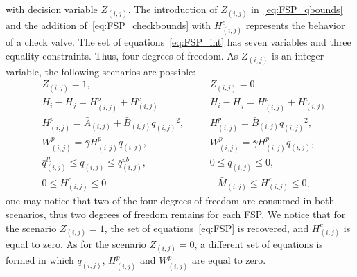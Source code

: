 with decision variable $Z_{(i,j)}$. The introduction of $Z_{(i,j)}$ in~\eqref{eq:FSP_qbounds} and the addition of~\eqref{eq:FSP_checkbounds} with $H^c_{(i,j)}$ represents the behavior of a check valve. The set of equations~\eqref{eq:FSP_int} has seven variables and three equality constraints. Thus, four degrees of freedom. As $Z_{(i,j)}$ is an integer variable, the following scenarios are possible:
\begin{subequations}
    \begin{alignat}{2}
        &Z_{(i,j)} = 1, && Z_{(i,j)} = 0
        \\
        & H_i - H_j = H^p_{(i,j)} + H^c_{(i,j)} && H_i - H_j = H^p_{(i,j)} + H^c_{(i,j)} \label{eq:FSP_hydraulic_balance}
        \\
        & H^p_{(i,j)} = \bar{A}_{(i,j)} + \bar{B}_{(i,j)}{q_{(i,j)}}^2, \quad && H^p_{(i,j)} = \bar{B}_{(i,j)}{q_{(i,j)}}^2,
        \\
        & W^p_{(i,j)} = \bar{\gamma} H^p_{(i,j)} q_{(i,j)}, && W^p_{(i,j)} = \bar{\gamma} H^p_{(i,j)} q_{(i,j)},
        \\
        & \bar{q}_{(i,j)}^{lb} \leq  q_{(i,j)} \leq \bar q_{(i,j)}^{ub}, && 0 \leq q_{(i,j)} \leq 0,
        \\
        &0 \leq H^c_{(i,j)} \leq 0 && - \bar{M}_{(i,j)} \leq H^c_{(i,j)} \leq 0,
    \end{alignat}
\end{subequations}
one may notice that two of the four degrees of freedom are consumed in both scenarios, thus two degrees of freedom remains for each FSP\@. We notice that for the scenario $Z_{(i,j)}=1$, the set of equations~\eqref{eq:FSP} is recovered, and $H^c_{(i,j)}$ is equal to zero. As for the scenario $Z_{(i,j)}=0$, a different set of equations is formed in which $q_{(i,j)}$, $H^p_{(i,j)}$ and $W^p_{(i,j)} $ are equal to zero.

